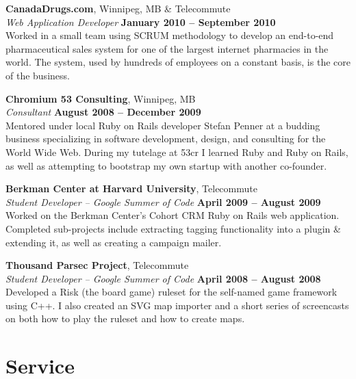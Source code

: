 \documentclass[margin,line,letterpaper]{resume}
\begin{document}
\begin{resume}
  {\bf CanadaDrugs.com}, Winnipeg, MB \& Telecommute \vspace{2mm}\\\vspace{1mm}%
  {\sl Web Application Developer} \hfill {\bf January 2010 -- September 2010}\\
  Worked in a small team using SCRUM methodology to develop an end-to-end pharmaceutical sales system for one of the largest internet pharmacies in the world. The system, used by hundreds of employees on a constant basis, is the core of the business.

  {\bf Chromium 53 Consulting}, Winnipeg, MB \vspace{2mm}\\\vspace{1mm}%
  {\sl Consultant} \hfill {\bf August 2008 -- December 2009}\\
  Mentored under local Ruby on Rails developer Stefan Penner at a budding business specializing in software development, design, and consulting for the World Wide Web. During my tutelage at 53cr I learned Ruby and Ruby on Rails, as well as attempting to bootstrap my own startup with another co-founder.

  {\bf Berkman Center at Harvard University}, Telecommute \vspace{2mm}\\\vspace{1mm}%
  {\sl Student Developer – Google Summer of Code} \hfill {\bf April 2009 -- August 2009}\\
  Worked on the Berkman Center’s Cohort CRM Ruby on Rails web application. Completed sub-projects include extracting tagging functionality into a plugin \& extending it, as well as creating a campaign mailer.

{\bf Thousand Parsec Project}, Telecommute \vspace{2mm}\\\vspace{1mm}%
  {\sl Student Developer --  Google Summer of Code } \hfill {\bf April 2008 -- August 2008}\\
  Developed a Risk (the board game) ruleset for the self-named game framework using C++. I also created an SVG map importer and a short series of screencasts on both how to play the ruleset and how to create maps.

  \section{\mysidestyle Service}


\end{resume}
\end{document}
